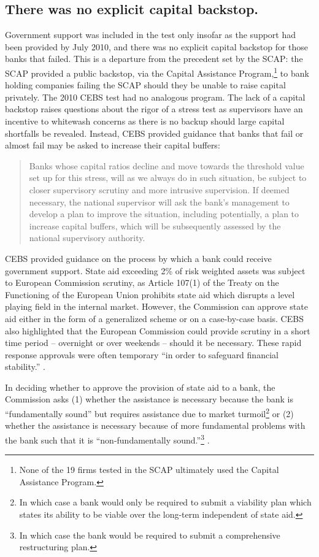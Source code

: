 \documentclass[12pt]{article}
\begin{document}
\subsection{There was no explicit capital backstop.}

Government support was included in the test only insofar as the support had been provided by July 2010, and there was no explicit capital backstop for those banks that failed. This is a departure from the precedent set by the SCAP: the SCAP provided a public backstop, via the Capital Assistance Program,\footnote{None of the 19 firms tested in the SCAP ultimately used the Capital Assistance Program.} to bank holding companies failing the SCAP should they be unable to raise capital privately. The 2010 CEBS test had no analogous program. The lack of a capital backstop raises questions about the rigor of a stress test as supervisors have an incentive to whitewash concerns as there is no backup should large capital shortfalls be revealed. Instead, CEBS provided guidance that banks that fail or almost fail may be asked to increase their capital buffers:

\begin{quote}
Banks whose capital ratios decline and move towards the threshold value set up for this stress, will as we always do in such situation, be subject to closer supervisory scrutiny and more intrusive supervision. If deemed necessary, the national supervisor will ask the bank's management to develop a plan to improve the situation, including potentially, a plan to increase capital buffers, which will be subsequently assessed by the national supervisory authority.
\end{quote}

CEBS provided guidance on the process by which a bank could receive government support. State aid exceeding 2\% of risk weighted assets was subject to European Commission scrutiny, as Article 107(1) of the Treaty on the Functioning of the European Union prohibits state aid which disrupts a level playing field in the internal market. However, the Commission can approve state aid either in the form of a generalized scheme or on a case-by-case basis. CEBS also highlighted that the European Commission could provide scrutiny in a short time period -- overnight or over weekends -- should it be necessary. These rapid response approvals were often temporary ``in order to safeguard financial stability.'' \citep{QA}.

In deciding whether to approve the provision of state aid to a bank, the Commission asks (1) whether the assistance is necessary because the bank is ``fundamentally sound'' but requires assistance due to market turmoil\footnote{In which case a bank would only be required to submit a viability plan which states its ability to be viable over the long-term independent of state aid.} or (2) whether the assistance is necessary because of more fundamental problems with the bank such that it is ``non-fundamentally sound.''\footnote{In which case the bank would be required to submit a comprehensive restructuring plan.} \citep{QA}.
\end{document}
